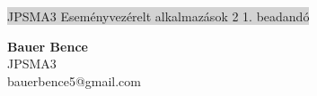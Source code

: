\documentclass[11pt,a4paper]{article}
\begin{document}
	\thispagestyle{empty}
	\begin{center}
		\colorbox{lightgray}{{\large JPSMA3} \hspace{3cm} {\large Eseményvezérelt alkalmazások 2 1. beadandó} \hspace{5cm} \thepage}
	\end{center}
	\begin{framed}
		\begin{flushleft}
			{\large \textbf{Bauer Bence}}
			\hspace{4cm}{\large 2018.10.06.}\\[0.1cm]
			{\large JPSMA3}\\[0.1cm]
			{\large bauerbence5@gmail.com}
		\end{flushleft}
	\end{framed}
\end{document}
